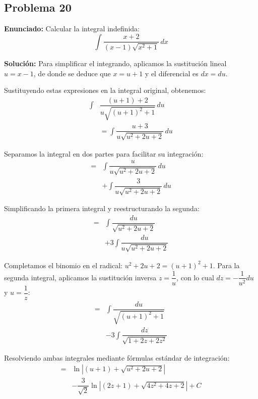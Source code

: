 \subsection*{Problema 20}

\noindent\textbf{Enunciado:}
Calcular la integral indefinida:
\begin{equation*}
\int \dfrac{x + 2}{(x - 1)\sqrt{x^2 + 1}} \, dx
\end{equation*}

\noindent\textbf{Solución:}
Para simplificar el integrando, aplicamos la sustitución lineal $u = x - 1$, de donde se deduce que $x = u + 1$ y el diferencial es $dx = du$.

Sustituyendo estas expresiones en la integral original, obtenemos:
\begin{align*}
\int &\dfrac{(u + 1) + 2}{u \sqrt{(u + 1)^2 + 1}} \, du \\
&= \int \dfrac{u + 3}{u \sqrt{u^2 + 2u + 2}} \, du
\end{align*}

Separamos la integral en dos partes para facilitar su integración:
\begin{align*}
= &\int \dfrac{u}{u \sqrt{u^2 + 2u + 2}} \, du \\
&+ \int \dfrac{3}{u \sqrt{u^2 + 2u + 2}} \, du
\end{align*}

Simplificando la primera integral y reestructurando la segunda:
\begin{align*}
= &\int \dfrac{du}{\sqrt{u^2 + 2u + 2}} \\
&+ 3 \int \dfrac{du}{u \sqrt{u^2 + 2u + 2}}
\end{align*}

Completamos el binomio en el radical: $u^2 + 2u + 2 = (u + 1)^2 + 1$. Para la segunda integral, aplicamos la sustitución inversa $z = \dfrac{1}{u}$, con lo cual $dz = -\dfrac{1}{u^2}du$ y $u = \dfrac{1}{z}$:
\begin{align*}
= &\int \dfrac{du}{\sqrt{(u + 1)^2 + 1}} \\
&- 3 \int \dfrac{dz}{\sqrt{1 + 2z + 2z^2}}
\end{align*}

Resolviendo ambas integrales mediante fórmulas estándar de integración:
\begin{align*}
= &\ln\left| (u + 1) + \sqrt{u^2 + 2u + 2} \right| \\
&- \dfrac{3}{\sqrt{2}} \ln\left| (2z + 1) + \sqrt{4z^2 + 4z + 2} \right| + C
\end{align*}

